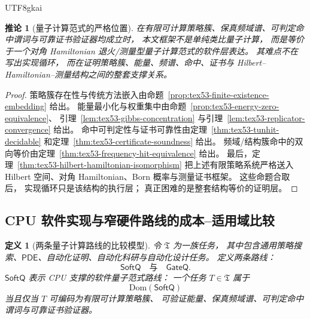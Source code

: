 \documentclass[12pt]{article}
\newtheorem{definition}{定义}[section]
\newtheorem{corollary}{推论}[section]
\newcommand{\PDE}{\mathsf{PDE}}
\begin{document}
\begin{CJK*}{UTF8}{gkai}
\begin{corollary}[量子计算范式的严格位置]
\label{cor:tex53-quantum-paradigm-position}
在有限可计算策略簇、保真频域谱、可判定命中谓词与可靠证书验证器均成立时，
本文框架不是单纯类比量子计算，
而是等价于一个对角 Hamiltonian 退火/测量型量子计算范式的软件层表达。
其难点不在写出实现循环，
而在证明策略簇、能量、频谱、命中、证书与 Hilbert--Hamiltonian--测量结构之间的整套支撑关系。
\end{corollary}

\begin{proof}
策略簇存在性与传统方法嵌入由命题~\ref{prop:tex53-finite-existence-embedding} 给出。
能量最小化与权重集中由命题~\ref{prop:tex53-energy-zero-equivalence}、
引理~\ref{lem:tex53-gibbs-concentration} 与引理~\ref{lem:tex53-replicator-convergence} 给出。
命中可判定性与证书可靠性由定理~\ref{thm:tex53-tunhit-decidable}
和定理~\ref{thm:tex53-certificate-soundness} 给出。
频域/结构簇命中的双向等价由定理~\ref{thm:tex53-frequency-hit-equivalence} 给出。
最后，定理~\ref{thm:tex53-hilbert-hamiltonian-isomorphism}
把上述有限策略系统严格送入 Hilbert 空间、对角 Hamiltonian、Born 概率与测量证书框架。
这些命题合取后，
实现循环只是该结构的执行层；
真正困难的是整套结构等价的证明层。
\end{proof}

\subsection{CPU 软件实现与窄硬件路线的成本--适用域比较}
\label{subsec:tex53-cpu-vs-gate-route}

\begin{definition}[两条量子计算路线的比较模型]
\label{def:tex53-route-comparison}
令 \(\mathfrak T\) 为一族任务，
其中包含通用策略搜索、\(\PDE\)、自动化证明、自动化科研与自动化设计任务。
定义两条路线：
\[
  \mathsf{SoftQ}
  \quad\text{与}\quad
  \mathsf{GateQ}.
\]
\(\mathsf{SoftQ}\) 表示 CPU 支撑的软件量子范式路线：
一个任务 \(T\in\mathfrak T\) 属于
\[
  \mathrm{Dom}(\mathsf{SoftQ})
\]
当且仅当 \(T\) 可编码为有限可计算策略簇、
可验证能量、保真频域谱、可判定命中谓词与可靠证书验证器。


\end{definition}
\end{CJK*}
\end{document}
